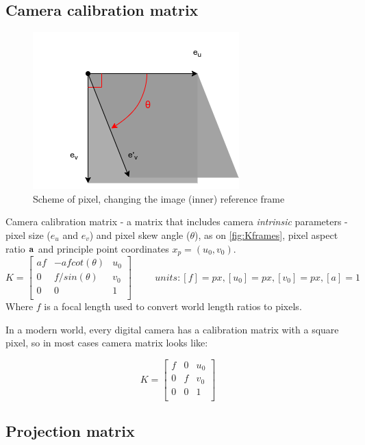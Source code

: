 \subsection{Camera calibration matrix}
\begin{figure}[h]
    \centering
    \includegraphics[width=.6\textwidth]{graphics/pixel.png}
    \caption{Scheme of pixel, changing the image (inner) reference frame}
    \label{fig:Kframes}
\end{figure}
Camera calibration matrix - a matrix that includes camera \textit{intrinsic} parameters - pixel size ($e_u$ and $e_v$) and pixel skew angle ($\theta$), as on \autoref{fig:Kframes}, pixel aspect ratio $\bf{a}$ and principle point coordinates $x_p = (u_0, v_0)$.
$$
K = \begin{bmatrix}
    af & -a f cot(\theta) & u_0 \\
    0 & f / sin(\theta) & v_0 \\
    0 & 0 & 1 \\
\end{bmatrix} \hspace{1cm} units: [f]=px, [u_0]=px, [v_0]=px, [a]=1
$$ 
Where $f$ is a focal length used to convert world length ratios to pixels.

In a modern world, every digital camera has a calibration matrix with a square pixel, so in most cases camera matrix looks like:

$$
K = \begin{bmatrix}
    f & 0 & u_0 \\
    0 & f & v_0 \\
    0 & 0 & 1 \\
\end{bmatrix}
$$

\subsection{Projection matrix}

